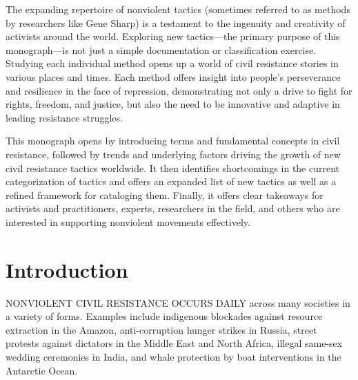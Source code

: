 \documentclass[twoside,a4paper,12pt,fleqn,openany]{extbook}
\begin{document}
The expanding repertoire of nonviolent tactics (sometimes referred to as methods by researchers like Gene Sharp) is a testament to the ingenuity and creativity of activists around the world. Exploring new tactics—the primary purpose of this monograph—is not just a simple documentation or classification exercise. Studying each individual method opens up a world of civil resistance stories in various places and times. Each method offers insight into people’s
perseverance and resilience in the face of repression, demonstrating not only a drive to fight for rights, freedom, and justice, but also the need to be innovative and adaptive in leading resistance struggles.

This monograph opens by introducing terms and fundamental concepts in civil resistance, followed by trends and underlying factors driving the growth of new civil resistance tactics worldwide. It then identifies shortcomings in the current categorization of tactics and offers an expanded list of new tactics as well as a refined framework for cataloging them. Finally, it offers clear takeaways for activists and practitioners, experts, researchers in the field, and others who are interested in supporting nonviolent movements effectively.

\chapter*{Introduction}

NONVIOLENT CIVIL RESISTANCE OCCURS DAILY across many societies in a variety of forms. Examples include indigenous blockades against resource extraction in the Amazon, anti-corruption hunger strikes in Russia, street protests against dictators in the Middle East and North Africa, illegal same-sex wedding ceremonies in India, and whale protection by boat interventions in the Antarctic Ocean.
\end{document}
